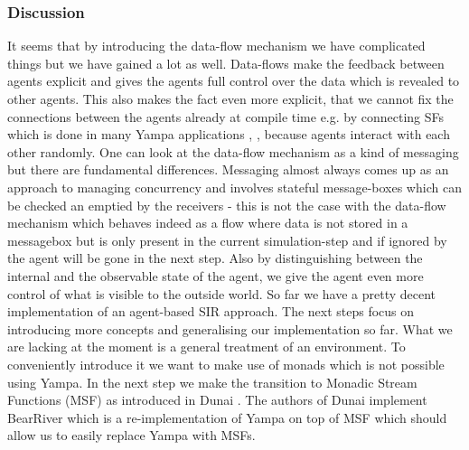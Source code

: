 \subsubsection{Discussion}
It seems that by introducing the data-flow mechanism we have complicated things but we have gained a lot as well. Data-flows make the feedback between agents explicit and gives the agents full control over the data which is revealed to other agents. This also makes the fact even more explicit, that we cannot fix the connections between the agents already at compile time e.g. by connecting SFs which is done in many Yampa applications \cite{nilsson_functional_2002}, \cite{courtney_yampa_2003}, \cite{nilsson_declarative_2014} because agents interact with each other randomly. One can look at the data-flow mechanism as a kind of messaging but there are fundamental differences. Messaging almost always comes up as an approach to managing concurrency and involves stateful message-boxes which can be checked an emptied by the receivers - this is not the case with the data-flow mechanism which behaves indeed as a flow where data is not stored in a messagebox but is only present in the current simulation-step and if ignored by the agent will be gone in the next step.
Also by distinguishing between the internal and the observable state of the agent, we give the agent even more control of what is visible to the outside world.
So far we have a pretty decent implementation of an agent-based SIR approach. The next steps focus on introducing more concepts and generalising our implementation so far. What we are lacking at the moment is a general treatment of an environment. To conveniently introduce it we want to make use of monads which is not possible using Yampa. In the next step we make the transition to Monadic Stream Functions (MSF) as introduced in Dunai \cite{perez_functional_2016}. The authors of Dunai implement BearRiver which is a re-implementation of Yampa on top of MSF which should allow us to easily replace Yampa with MSFs.